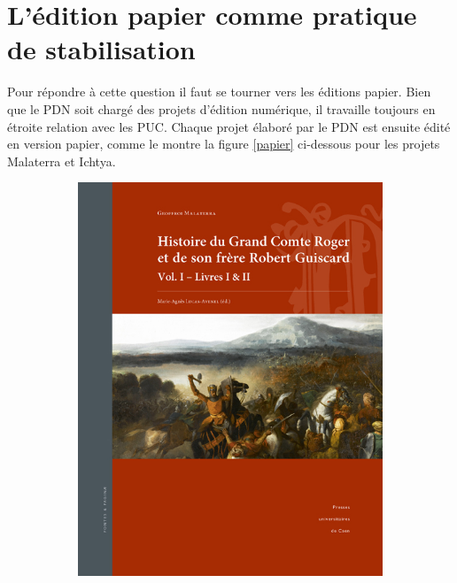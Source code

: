 \documentclass[a4paper,12pt,twoside]{book}
\begin{document}
\section{L'édition papier comme pratique de stabilisation}

Pour répondre à cette question il faut se tourner vers les éditions papier. Bien que le \acrshort{PDN} soit chargé des projets d'édition numérique, il travaille toujours en étroite relation avec les \acrshort{PUC}. Chaque projet élaboré par le \acrshort{PDN} est ensuite édité en version papier, comme le montre la figure \ref{papier} ci-dessous pour les projets Malaterra et Ichtya.

  \begin{figure}[H]
    \centering
    \begin{subfigure}[b]{0.3\linewidth}
      \includegraphics[width=\linewidth]{img/autre/couvMalaterra.jpg}
    \end{subfigure}
    \begin{subfigure}[b]{0.3\linewidth}

\end{subfigure}
\end{figure}
\end{document}
